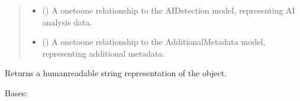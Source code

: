 \documentclass[letterpaper,10pt,english]{sphinxmanual}
\begin{document}
\begin{fulllineitems}
\begin{quote}
\begin{description}
\begin{itemize}
\item {} 
\sphinxAtStartPar
{} ({\hyperref[\detokenize{source/meta_models_management:meta_models_management.models.AIDetection}]{}}) \textendash{} A one\sphinxhyphen{}to\sphinxhyphen{}one relationship to the AIDetection model, representing AI analysis data.

\item {} 
\sphinxAtStartPar
{} ({\hyperref[\detokenize{source/meta_models_management:meta_models_management.models.AdditionalMetadata}]{}}) \textendash{} A one\sphinxhyphen{}to\sphinxhyphen{}one relationship to the AdditionalMetadata model, representing additional metadata.

\end{itemize}

\end{description}\end{quote}

\begin{fulllineitems}
\label{\detokenize{source/meta_models_management:meta_models_management.models.InputRecord.__str__}}
\pysigstartsignatures
{}
\pysigstopsignatures
\sphinxAtStartPar
Returns a human\sphinxhyphen{}readable string representation of the object.

\end{fulllineitems}



\begin{fulllineitems}

\pysigstartsignatures
{}
\pysigstopsignatures
\end{fulllineitems}


\begin{fulllineitems}
\label{\detokenize{source/meta_models_management:meta_models_management.models.InputRecord.DoesNotExist}}
\pysigstartsignatures
{}
\pysigstopsignatures
\sphinxAtStartPar
Bases: 


\end{fulllineitems}
\end{fulllineitems}
\end{document}
